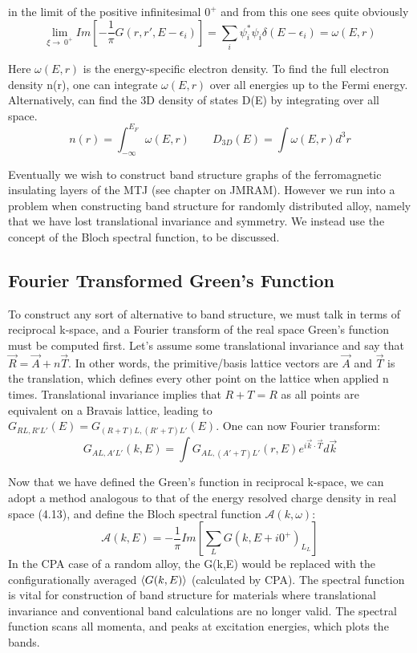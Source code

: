 \documentclass[12pt]{article}
\begin{document}
in the limit of the positive infinitesimal $0^+$ and from this one sees quite obviously
\begin{equation} \label{4.1} \tag{4.13}
\lim_{\xi\to\ 0^+}Im[-\frac{1}{\pi}G(r,r',E-\epsilon_i)]=\sum_i \psi^*_i\psi_i \delta(E-\epsilon_i)=\omega(E,r)
\end{equation}


Here $\omega(E,r)$ is the energy-specific electron density. To find the full electron density n(r), one can integrate $\omega(E,r)$ over all energies up to the Fermi energy. Alternatively, can find the 3D density of states D(E) by integrating over all space. 
\begin{equation} \label{4.1} \tag{4.14}
n(r)=\int_{-\infty}^{E_F}\omega(E,r) \qquad D_{3D}(E)=\int \omega(E,r) d^3r
\end{equation}

Eventually we wish to construct band structure graphs of the ferromagnetic insulating layers of the MTJ (see chapter on JMRAM). However we run into a problem when constructing band structure for randomly distributed alloy, namely that we have lost translational invariance and symmetry. We instead use the concept of the Bloch spectral function, to be discussed.

\subsection{Fourier Transformed Green's Function}

To construct any sort of alternative to band structure, we must talk in terms of reciprocal k-space, and a Fourier transform of the real space Green's function must be computed first. Let's assume some translational invariance and say that $\vec{R}=\vec{A}+n\vec{T}$. In other words, the primitive/basis lattice vectors are $\vec{A}$ and $\vec{T}$ is the translation, which defines every other point on the lattice when applied n times. Translational invariance implies that $R+T=R$ as all points are equivalent on a Bravais lattice, leading to $G_{RL,R'L'}(E)=G_{(R+T)L,(R'+T)L'}(E)$. One can now Fourier transform:
\begin{equation} \label{4.1} \tag{4.15}
G_{AL,A'L'}(k,E)=\int G_{AL,(A'+T)L'}(r,E)e^{i\vec{k}\cdot \vec{T}} d\vec{k}
\end{equation}

Now that we have defined the Green's function in reciprocal k-space, we can adopt a method analogous to that of the energy resolved charge density in real space (4.13), and define the Bloch spectral function\cite{drchal} $\mathcal{A}(k,\omega)$:
\begin{equation} \label{4.1} \tag{4.16}
\mathcal{A}(k,E)=-\frac{1}{\pi} Im[\sum_L G(k,E+i0^+)_L_L]
\end{equation}
In the CPA case of a random alloy, the G(k,E) would be replaced with the configurationally averaged $\expval{G(k,E)}$ (calculated by CPA). The spectral function is vital for construction of band structure for materials where translational invariance and conventional band calculations are no longer valid. The spectral function scans all momenta, and peaks at excitation energies, which plots the bands.
\end{document}
